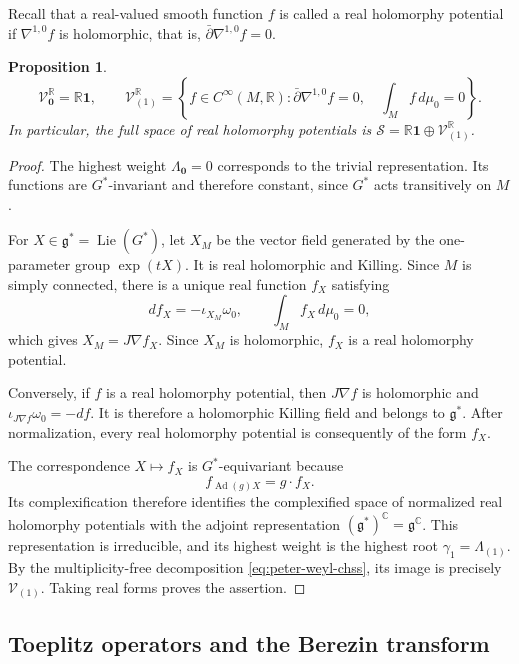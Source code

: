 \documentclass[11pt,reqno]{amsart}
\theoremstyle{corollary}
\theoremstyle{conjecture}
\theoremstyle{assumption}
\theoremstyle{proposition}
\newtheorem{proposition}[theorem]{Proposition}
\theoremstyle{remark}
\numberwithin{equation}{section}
\newcommand{\pp}{\bar\partial}
\begin{document}
Recall that a real-valued smooth function $f$ is called a real holomorphy potential if $\nabla^{1,0}f$ is holomorphic, that is, $\pp\nabla^{1,0}f=0$.

\begin{proposition}\label{prop:constants-holomorphy}
\[
\mathcal V_{\mathbf0}^{\mathbb R}=\mathbb R\mathbf1,\qquad
\mathcal V_{(1)}^{\mathbb R}=\left\{f\in C^\infty(M,\mathbb R)\colon \pp\nabla^{1,0}f=0,\quad \int_M f\,d\mu_0=0\right\}.
\]
In particular, the full space of real holomorphy potentials is $\mathcal S=\mathbb R\mathbf1\oplus\mathcal V_{(1)}^{\mathbb R}$.
\end{proposition}
\begin{proof}
The highest weight $\Lambda_{\mathbf0}=0$ corresponds to the trivial representation. Its functions are $G^*$-invariant and therefore constant, since $G^*$ acts transitively on $M$.

For $X\in\mathfrak g^*=\operatorname{Lie} (G^*)$, let $X_M$ be the vector field generated by the one-parameter group $\exp(tX)$. It is real holomorphic and Killing. Since $M$ is simply connected, there is a unique real function $f_X$ satisfying
\[
df_X=-\iota_{X_M}\omega_0,\qquad\int_M f_X\,d\mu_0=0,
\]
which gives $X_M=J\nabla f_X$. Since $X_M$ is holomorphic, $f_X$ is a real holomorphy potential.

Conversely, if $f$ is a real holomorphy potential, then $J\nabla f$ is holomorphic and $\iota_{J\nabla f}\omega_0=-df$. It is therefore a holomorphic Killing field and belongs to $\mathfrak{g}^*$. After normalization, every real holomorphy potential is consequently of the form $f_X$.

The correspondence $X\mapsto f_X$ is $G^*$-equivariant because
\[
f_{\operatorname{Ad}(g)X}=g\cdot f_X.
\]
Its complexification therefore identifies the complexified space of normalized real holomorphy potentials with the adjoint representation $(\mathfrak g^*)^{\mathbb C}=\mathfrak g^{\mathbb C}$. This representation is irreducible, and its highest weight is the highest root $\gamma_1=\Lambda_{(1)}$. By the multiplicity-free decomposition \eqref{eq:peter-weyl-chss}, its image is precisely $\mathcal V_{(1)}$. Taking real forms proves the assertion.
\end{proof}

\subsection{Toeplitz operators and the Berezin transform}
\label{subsec:berezin}
\end{document}
